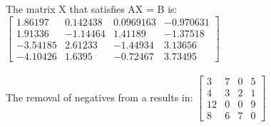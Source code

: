The matrix X that satisfies AX = B is: $\begin{bmatrix}
1.86197 & 0.142438 & 0.0969163 & -0.970631 \\1.91336 & -1.14464 & 1.41189 & -1.37518 \\-3.54185 & 2.61233 & -1.44934 & 3.13656 \\-4.10426 & 1.6395 & -0.72467 & 3.73495
\end{bmatrix}$\\
\\
The removal of negatives from a results in: $\begin{bmatrix}
3 & 7 & 0 & 5 \\4 & 3 & 2 & 1 \\12 & 0 & 0 & 9 \\8 & 6 & 7 & 0
\end{bmatrix}$\\
\\
